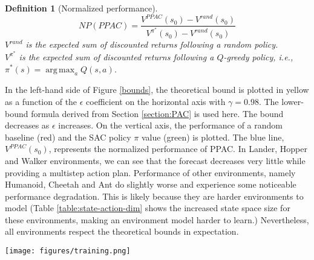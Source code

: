 \documentclass{article}
\DeclareMathOperator*{\argmax}{arg\,max}
\newtheorem{definition}{Definition}[]
\begin{document}
            \begin{definition}[Normalized performance]
                $$NP(PPAC)=\frac{V^{PPAC}(s_0) -V^{rand}(s_0)}{V^{\pi^*}(s_0)-V^{rand}(s_0)}$$
                $V^{rand}$ is the expected sum of discounted returns following a random policy.\\
                $V^{\pi^*}$ is the expected sum of discounted returns following a $Q$-greedy policy, i.e., $\pi^*(s)=\argmax_aQ(s,a)$. 
            \end{definition}

            In the left-hand side of Figure \ref{bounds}, the theoretical bound is plotted in yellow as a function of the $\epsilon$ coefficient on the horizontal axis with $\gamma = 0.98$. The lower-bound formula derived from Section \ref{section:PAC} is used here. The bound decreases as $\epsilon$ increases. On the vertical axis, the performance of a random baseline (red) and the SAC policy $\pi$ value (green) is plotted. The blue line, $V^{PPAC}(s_0)$, represents the normalized performance of PPAC. In Lander, Hopper and Walker environments, we can see that the forecast decreases very little while providing a multistep action plan. Performance of other environments, namely Humanoid, Cheetah and Ant do slightly worse and experience some noticeable performance degradation. This is likely because they are harder environments to model (Table \ref{table:state-action-dim} shows the increased state space size for these environments, making an environment model harder to learn.) Nevertheless, all environments respect the theoretical bounds in expectation.  


            \begin{figure*}
                \texttt{[image: figures/training.png]}
                \caption{Top: training curves from representative environments. The $y$ axis is the normalized episode reward. Bottom: The associated forecast for the environments. The baseline algorithm shows SAC without any modifications. Experiments run with 5 replications of each setting. Shown with 1 std. Mean and std aggregated over rolling window of 20 episodes. The forecast of PPAC(0.1) for cheetah and humanoid has been capped at 16 and 20, respectively, for computational considerations. Humanoid-0.1 is stopped after 3e6 steps as it fails to improve beyond random.}
                \label{figure:training}
            \end{figure*}
\end{document}

